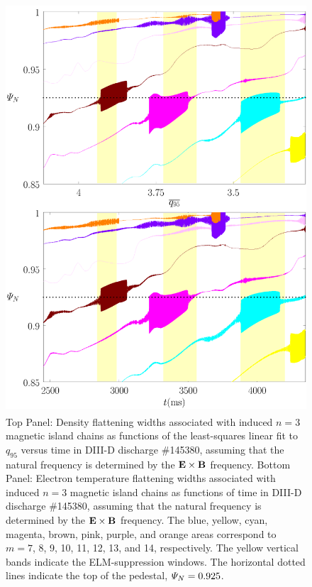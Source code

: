 \documentclass[12pt,prb,aps]{revtex4-1}
\begin{document}
\begin{figure}
\includegraphics[height=6in]{fig10.pdf}
\caption{Top Panel: Density flattening widths associated with induced $n=3$ magnetic island  chains as functions of the least-squares linear fit to $q_{95}$ versus time
in   DIII-D discharge \#145380, assuming that the natural frequency is  determined by the ${\bf E}\times {\bf B}$
frequency.
Bottom Panel:  Electron temperature flattening widths associated with induced $n=3$ magnetic island chains as functions of time
in   DIII-D discharge \#145380, assuming that the natural frequency is determined by the ${\bf E}\times {\bf B}$
frequency. The blue, yellow, cyan, magenta, brown, pink,
purple, and orange  areas correspond to $m=7$, 8, 9, 10, 11, 12, 13, and 14, respectively. The yellow vertical bands indicate the ELM-suppression windows. 
The horizontal dotted lines indicate the top of the pedestal, ${\mit\Psi}_N=0.925$.} \label{fig10}
\end{figure}
\end{document}
